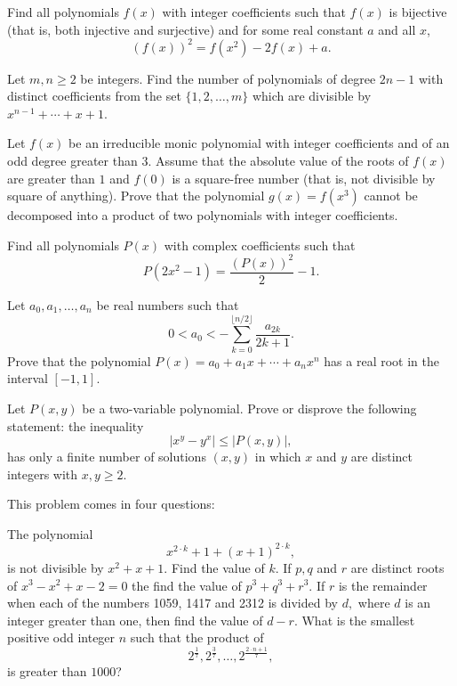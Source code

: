 \begin{question}[name={1997 Romania}]
    Find all polynomials $f(x)$ with integer coefficients such that $f(x)$ is bijective (that is, both injective and surjective) and for some real constant $a$ and all $x$, \[(f(x))^2 = f(x^2)-2f(x)+a.\]
\end{question}

\begin{question}[name={1995 Romania}]
    Let $m,n\geq 2$ be integers. Find the number of polynomials of degree $2n-1$ with distinct coefficients from the set $\{1,2,\dots,m\}$ which are divisible by $x^{n-1}+\cdots+x+1$.
\end{question}

\begin{question}[name={1995 Romania}]
    Let $f(x)$ be an irreducible monic polynomial with integer coefficients and of an odd degree greater than $3$. Assume that the absolute value of the roots of $f(x)$ are greater than $1$ and $f(0)$ is a square-free number (that is, not divisible by square of anything). Prove that the polynomial $g(x)=f(x^3)$ cannot be decomposed into a product of two polynomials with integer coefficients.
\end{question}

\begin{question}[name={1998 Iran}]
    Find all polynomials $P(x)$ with complex coefficients such that
    \[P(2x^2-1) = \frac{(P(x))^2}{2}-1.\]
\end{question}


\begin{question}[name={1998 Iran}]
    Let $a_0,a_1,\dots,a_n$ be real numbers such that
    \[0< a_0 < - \sum_{k=0}^{\lfloor n/2 \rfloor} \frac{a_{2k}}{2k+1}.\]
    Prove that the polynomial $P(x)=a_0+a_1x+\cdots+a_n x^{n}$ has a real root in the interval $[-1,1]$.
\end{question}

\begin{question}
    Let $P(x,y)$ be a two-variable polynomial. Prove or disprove the following statement: the inequality \[|x^y-y^x|\leq |P(x,y)|,\] has only a finite number of solutions $(x,y)$ in which $x$ and $y$ are distinct integers with $x,y \geq 2$.
\end{question}

\begin{question}[name={1988 IMO Longlist}]
This problem comes in four questions:
\begin{tasks}
    \task The polynomial \[x^{2 \cdot k} + 1 + (x+1)^{2 \cdot k},\] is not divisible by $x^2 + x + 1.$ Find the value of $k$.
    \task If $p,q$ and $r$ are distinct roots of $x^3 - x^2 + x - 2 = 0$ the find the value of $p^3 + q^3 + r^3$.
    \task If $r$ is the remainder when each of the numbers 1059, 1417 and 2312 is divided by $d,$ where $d$ is an integer greater than one, then find the value of $d-r$.
    \task What is the smallest positive odd integer $n$ such that the product of
    \[2^{\frac{1}{7}}, 2^{\frac{3}{7}}, \dots, 2^{\frac{2 \cdot n + 1}{7}},\]
    is greater than $1000$?
\end{tasks}
\end{question}


